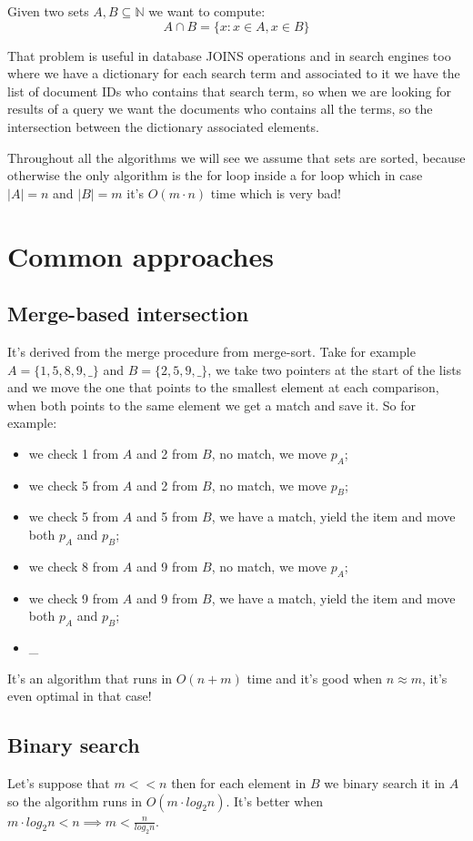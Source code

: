 Given two sets $A, B \subseteq \mathbb{N}$ we want to compute:
$$
    A \cap B = \{ x : x \in A, x \in B \}
$$

That problem is useful in database JOINS operations and in search engines too where we have a dictionary for each search term and associated to it we have the list of document IDs who contains that search term, so when we are looking for results of a query we want the documents who contains all the terms, so the intersection between the dictionary associated elements.

Throughout all the algorithms we will see we assume that sets are sorted, because otherwise the only algorithm is the for loop inside a for loop which in case $|A|=n $ and $|B|=m$ it's $O(m \cdot n)$ time which is very bad!

\section{Common approaches}
\subsection{Merge-based intersection}
It's derived from the merge procedure from merge-sort.
Take for example $A = \{ 1, 5, 8, 9, \_ \}$ and $B = \{ 2, 5, 9, \_ \}$, we take two pointers at the start of the lists and we move the one that points to the smallest element at each comparison, when both points to the same element we get a match and save it.
So for example:
\begin{itemize}
    \item we check 1 from $A$ and 2 from $B$, no match, we move $p_A$;
    \item we check 5 from $A$ and 2 from $B$, no match, we move $p_B$;
    \item we check 5 from $A$ and 5 from $B$, we have a match, yield the item and move both $p_A$ and $p_B$;
    \item we check 8 from $A$ and 9 from $B$, no match, we move $p_A$;
    \item we check 9 from $A$ and 9 from $B$, we have a match, yield the item and move both $p_A$ and $p_B$;
    \item \_
\end{itemize}

It's an algorithm that runs in $O(n+m)$ time and it's good when $n \approx m$, it's even optimal in that case!

\subsection{Binary search}
Let's suppose that $m << n$ then for each element in $B$ we binary search it in $A$ so the algorithm runs in $O(m \cdot log_2 n)$.
It's better when $m \cdot log_2 n < n \implies m < \frac{n}{log_2 n}$.

